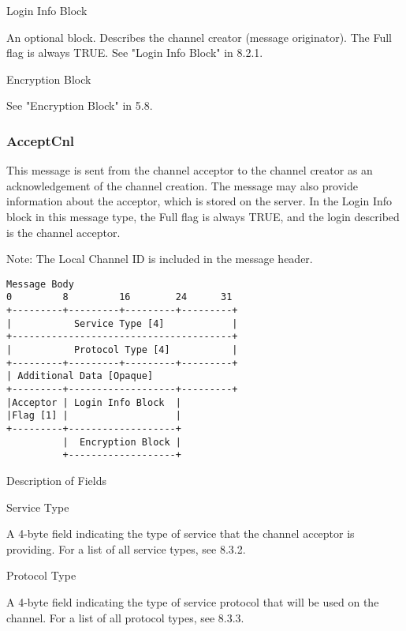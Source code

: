\documentclass[titlepage,oneside]{book}
\begin{document}
\par{} Login Info Block

\subpar{}  An optional block. Describes the channel creator (message
  originator). The Full flag is always TRUE. See "Login Info Block" in
  8.2.1.

\par{} Encryption Block

\subpar{}  See "Encryption Block" in 5.8.

\subsubsection{AcceptCnl}

\par{} This message is sent from the channel acceptor to the channel creator
as an acknowledgement of the channel creation. The message may also
provide information about the acceptor, which is stored on the server.
In the Login Info block in this message type, the Full flag is always
TRUE, and the login described is the channel acceptor.

\par{} Note: The Local Channel ID is included in the message header.

\begin{verbatim}
Message Body
0         8         16        24      31
+---------+---------+---------+---------+
|           Service Type [4]            |
+---------------------------------------+
|           Protocol Type [4]           |
+---------+---------+---------+---------+
| Additional Data [Opaque]
+---------+-------------------+---------+
|Acceptor | Login Info Block  |
|Flag [1] |                   |
+---------+-------------------+
          |  Encryption Block |
          +-------------------+
\end{verbatim}

\par{}Description of Fields

\par{} Service Type

\subpar{}  A 4-byte field indicating the type of service that the channel
  acceptor is providing. For a list of all service types, see
  8.3.2.

\par{} Protocol Type

\subpar{}  A 4-byte field indicating the type of service protocol that will be
  used on the channel. For a list of all protocol types, see
  8.3.3.
\end{document}
